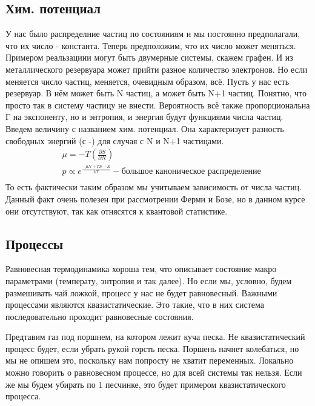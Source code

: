 \documentclass[a4paper, 12pt]{article}
\begin{document}
	\subsection{Хим. потенциал}
	У нас было распределние частиц по состояниям и мы постоянно предполагали, что их число - константа. Теперь предположим, что их число может меняться. Примером реальзациии могут быть двумерные системы, скажем графен. И из металлического резервуара может прийти разное количество электронов. Но если меняется число частиц, меняется, очевидным образом, всё. Пусть у нас есть резервуар. В нём может быть N частиц, а может быть N+1 частиц. Понятно, что просто так в систему частицу не внести. Вероятность всё также пропорциональна Г на экспоненту, но и энтропия, и энергия будут функциями числа частиц. Введем величину с названием хим. потенциал. Она характеризует разность свободных энергий (с -) для случая с N и N+1 частицами.
	\begin{equation*}
		\begin{aligned}
			& \mu =- T (\frac{\partial S}{\partial N})                                                                            \\
			& p \propto e^{\frac{-\mu N + TS- E}{kT}} - \text{большое каноническое распределение} \\
		\end{aligned}
	\end{equation*}
	То есть фактически таким образом мы учитываем зависимость от числа частиц. Данный факт очень полезен при рассмотрении Ферми и Бозе, но в данном курсе они отсутствуют, так как отнясятся к квантовой статистике.
	\subsection{Процессы}
	Равновесная термодинамика хороша тем, что описывает состояние макро параметрами (температу, энтропия и так далее). Но если мы, условно, будем размешивать чай ложкой, процесс у нас не будет равновесный. Важными процессами являются квазистатические. Это такие, что в них система последовательно проходит равновесные состояния. 
	
	Предтавим газ под поршнем, на котором лежит куча песка. Не квазистатический процесс будет, если убрать рукой горсть песка. Поршень начнет колебаться, но мы не опишем это, поскольку нам попросту не хватит переменных. Локально можно говорить о равновесном процессе, но для всей системы так нельзя. Если же мы будем убирать по 1 песчинке, это будет примером квазистатического процесса.
	
\end{document}
